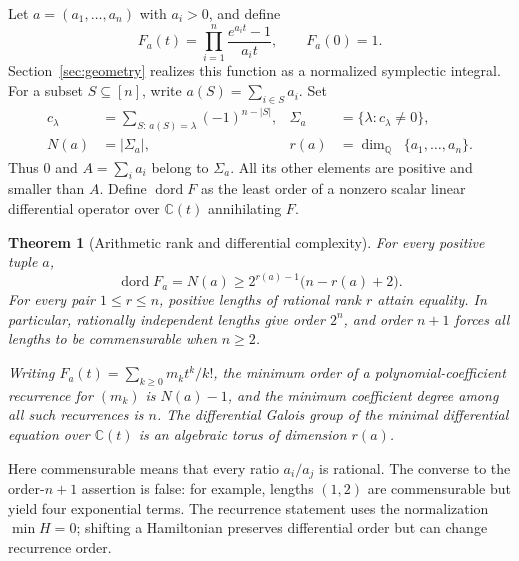 \documentclass[11pt]{article}
\newtheorem{theorem}{Theorem}[section]
\theoremstyle{definition}
\theoremstyle{remark}
\newcommand{\Q}{\mathbb Q}
\newcommand{\C}{\mathbb C}
\DeclareMathOperator{\spanQ}{span_{\mathbb Q}}
\numberwithin{equation}{section}
\begin{document}
Let $a=(a_1,\ldots,a_n)$ with $a_i>0$, and define
\begin{equation}\label{eq:main-F}
 F_a(t)=\prod_{i=1}^n\frac{e^{a_i t}-1}{a_i t},\qquad F_a(0)=1.
\end{equation}
Section~\ref{sec:geometry} realizes this function as a normalized
symplectic integral. For a subset $S\subseteq[n]$, write
$a(S)=\sum_{i\in S}a_i$. Set
\begin{equation}\label{eq:visible-def}
\begin{aligned}
 c_\lambda&=\sum_{S:\,a(S)=\lambda}(-1)^{n-|S|},
 &\Sigma_a&=\{\lambda:c_\lambda\ne0\},\\
 N(a)&=|\Sigma_a|,
 &r(a)&=\dim_\Q\spanQ\{a_1,\ldots,a_n\}.
\end{aligned}
\end{equation}
Thus $0$ and $A=\sum_i a_i$ belong to $\Sigma_a$. All its other
elements are positive and smaller than $A$. Define $\operatorname{dord}F$
as the least order of a nonzero scalar linear differential operator over
$\C(t)$ annihilating $F$.

\begin{theorem}[Arithmetic rank and differential complexity]
\label{thm:main}
For every positive tuple $a$,
\begin{equation}\label{eq:main-bound}
 \operatorname{dord}F_a=N(a)\ge
 2^{r(a)-1}\bigl(n-r(a)+2\bigr).
\end{equation}
For every pair $1\le r\le n$, positive lengths of rational rank $r$
attain equality. In particular, rationally independent lengths give
order $2^n$, and order $n+1$ forces all lengths to be commensurable
when $n\ge2$.

Writing $F_a(t)=\sum_{k\ge0}m_k t^k/k!$, the minimum order of a
polynomial-coefficient recurrence for $(m_k)$ is $N(a)-1$, and the
minimum coefficient degree among all such recurrences is $n$.
The differential Galois group of the minimal differential equation
over $\C(t)$ is an algebraic torus of dimension $r(a)$.
\end{theorem}

Here commensurable means that every ratio $a_i/a_j$ is rational. The
converse to the order-$n+1$ assertion is false: for example, lengths
$(1,2)$ are commensurable but yield four exponential terms. The
recurrence statement uses the normalization $\min H=0$; shifting a
Hamiltonian preserves differential order but can change recurrence order.
\end{document}
